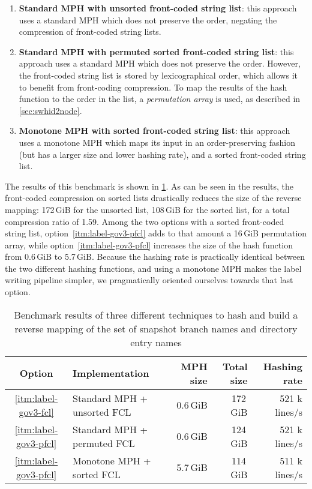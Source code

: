 \begin{enumerate}
    \item \label{itm:label-gov3-fcl}
        \textbf{Standard \gls{MPH} with unsorted front-coded string list}: this
        approach uses a standard \gls{MPH} which does not preserve the order,
        negating the compression of front-coded string lists.
    \item \label{itm:label-gov3-pfcl}
        \textbf{Standard \gls{MPH} with permuted sorted front-coded string
        list}: this approach uses a standard \gls{MPH} which does not preserve
        the order. However, the front-coded string list is stored by
        lexicographical order, which allows it to benefit from front-coding
        compression. To map the results of the hash function to the order in
        the list, a \emph{permutation array} is used, as described in
        \cref{sec:swhid2node}.
    \item \label{itm:label-lcp-fcl}
        \textbf{Monotone \gls{MPH} with sorted front-coded string list}: this
        approach uses a monotone \gls{MPH} which maps its input in an
        order-preserving fashion (but has a larger size and lower hashing
        rate), and a sorted front-coded string list.
\end{enumerate}

The results of this benchmark is shown in \cref{tab:label-mph-benchmark}. As
can be seen in the results, the front-coded compression on sorted lists
drastically reduces the size of the reverse mapping: 172\,GiB for the unsorted
list, 108\,GiB for the sorted list, for a total compression ratio of 1.59.
Among the two options with a sorted front-coded string list,
option~\ref{itm:label-gov3-pfcl} adds to that amount a 16\,GiB permutation
array, while option~\ref{itm:label-gov3-pfcl} increases the size of the hash
function from 0.6\,GiB to 5.7\,GiB. Because the hashing rate is practically
identical between the two different hashing functions, and using a monotone
\gls{MPH} makes the label writing pipeline simpler, we pragmatically oriented
ourselves towards that last option.

\begin{table}
    \centering
    \caption{Benchmark results of three different techniques to hash and build
        a reverse mapping of the set of snapshot branch names and directory entry
    names}%
    \label{tab:label-mph-benchmark}
    \begin{tabular}{c l r r r}
        \textbf{Option} & \textbf{Implementation} & \textbf{MPH size} & \textbf{Total size} & \textbf{Hashing rate} \\ \hline
        \ref{itm:label-gov3-fcl} & Standard MPH + unsorted FCL & 0.6\,GiB & 172\,GiB & 521 k lines/s \\
        \ref{itm:label-gov3-pfcl} & Standard MPH + permuted FCL & 0.6\,GiB & 124\,GiB & 521 k lines/s \\
        \ref{itm:label-gov3-pfcl} & Monotone MPH + sorted FCL & 5.7\,GiB & 114\,GiB & 511 k lines/s
    \end{tabular}
\end{table}

